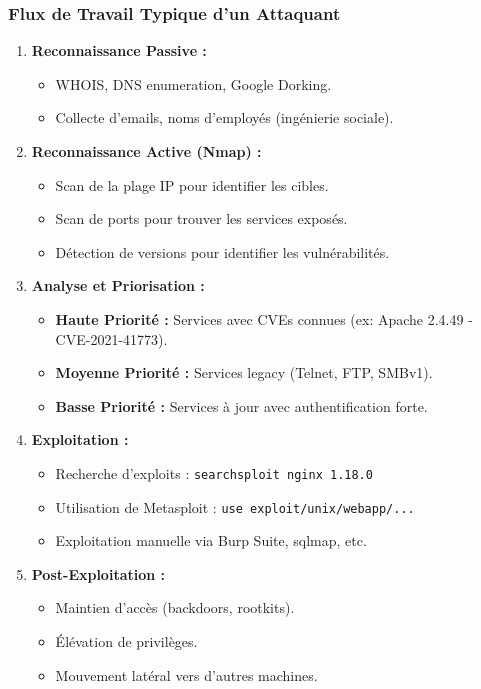 \documentclass[12pt,a4paper,openany]{report}
\begin{document}
	\subsubsection{Flux de Travail Typique d'un Attaquant}
	\begin{enumerate}
		\item \textbf{Reconnaissance Passive :}
		\begin{itemize}
			\item WHOIS, DNS enumeration, Google Dorking.
			\item Collecte d'emails, noms d'employés (ingénierie sociale).
		\end{itemize}
		
		\item \textbf{Reconnaissance Active (Nmap) :}
		\begin{itemize}
			\item Scan de la plage IP pour identifier les cibles.
			\item Scan de ports pour trouver les services exposés.
			\item Détection de versions pour identifier les vulnérabilités.
		\end{itemize}
		
		\item \textbf{Analyse et Priorisation :}
		\begin{itemize}
			\item \textbf{Haute Priorité :} Services avec CVEs connues (ex: Apache 2.4.49 - CVE-2021-41773).
			\item \textbf{Moyenne Priorité :} Services legacy (Telnet, FTP, SMBv1).
			\item \textbf{Basse Priorité :} Services à jour avec authentification forte.
		\end{itemize}
		
		\item \textbf{Exploitation :}
		\begin{itemize}
			\item Recherche d'exploits : \texttt{searchsploit nginx 1.18.0}
			\item Utilisation de Metasploit : \texttt{use exploit/unix/webapp/...}
			\item Exploitation manuelle via Burp Suite, sqlmap, etc.
		\end{itemize}
		
		\item \textbf{Post-Exploitation :}
		\begin{itemize}
			\item Maintien d'accès (backdoors, rootkits).
			\item Élévation de privilèges.
			\item Mouvement latéral vers d'autres machines.
		\end{itemize}
	\end{enumerate}
	
\end{document}
